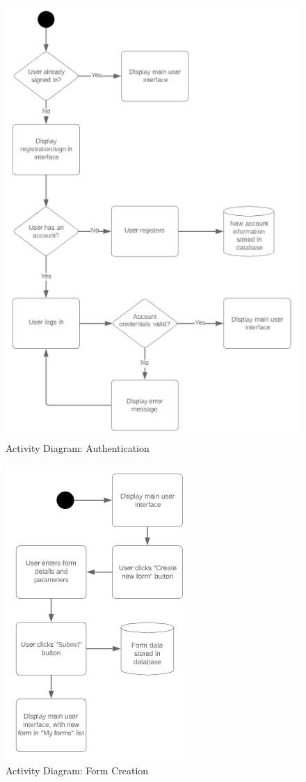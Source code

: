 \begin{figure}[]
\center
\includegraphics{../figures/ActivityDiagramAuthentication}
\caption{Activity Diagram: Authentication}
\end{figure}

\begin{figure}[]
\center
\includegraphics{../figures/ActivityDiagramFormCreation}
\caption{Activity Diagram: Form Creation}
\end{figure}

